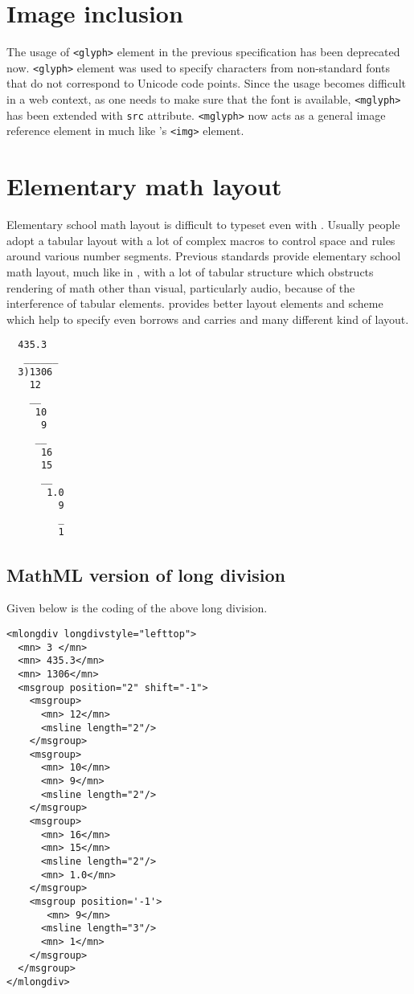 \documentclass[a4paper]{article}
\begin{document}
\section{Image inclusion}

The usage of \verb+<glyph>+ element in the previous \mathml specification has been deprecated now. \verb+<glyph>+ element was used to specify characters from non-standard fonts that do not correspond to Unicode code points. Since the usage becomes difficult in a web context, as one needs to make sure that the font is available, \verb+<mglyph>+ has been extended with \verb+src+ attribute. \verb+<mglyph>+ now acts as a general image reference element in \mathml much like \html's \verb+<img>+ element. 

\section{Elementary math layout}

Elementary school math layout is difficult to typeset even with \tex.  Usually people adopt a tabular layout with a lot of complex macros to control space and rules around various number segments. Previous \mathml standards provide elementary school math layout, much like in \tex, with a lot of tabular structure which obstructs rendering of math other than visual, particularly audio, because of the interference of tabular elements.   provides better layout elements and scheme which help to specify even borrows and carries and many different kind of layout.

\begin{verbatim}
  435.3
   ______
  3)1306
    12
    __
     10
      9
     __
      16
      15
      __
       1.0
         9
         _
         1
\end{verbatim}

\subsection{MathML version of long division}

Given below is the  coding of the above long division. 

\begin{verbatim}
<mlongdiv longdivstyle="lefttop">
  <mn> 3 </mn>
  <mn> 435.3</mn>
  <mn> 1306</mn>
  <msgroup position="2" shift="-1">
    <msgroup>
      <mn> 12</mn>
      <msline length="2"/>
    </msgroup>
    <msgroup>
      <mn> 10</mn>
      <mn> 9</mn>
      <msline length="2"/>
    </msgroup>
    <msgroup>
      <mn> 16</mn>
      <mn> 15</mn>
      <msline length="2"/>
      <mn> 1.0</mn> 
    </msgroup>
    <msgroup position='-1'>
       <mn> 9</mn>
      <msline length="3"/>
      <mn> 1</mn>
    </msgroup>
  </msgroup>
</mlongdiv>
\end{verbatim}
\end{document}
